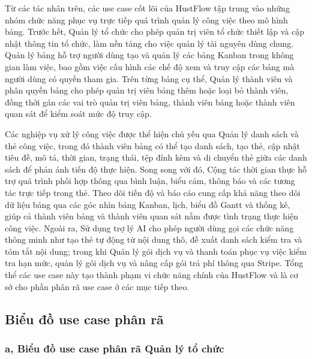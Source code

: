 \documentclass[../DoAn.tex]{subfiles}
\begin{document}
Từ các tác nhân trên, các use case cốt lõi của HustFlow tập trung vào những nhóm chức năng phục vụ trực tiếp quá trình quản lý công việc theo mô hình bảng. Trước hết, Quản lý tổ chức cho phép quản trị viên tổ chức thiết lập và cập nhật thông tin tổ chức, làm nền tảng cho việc quản lý tài nguyên dùng chung. Quản lý bảng hỗ trợ người dùng tạo và quản lý các bảng Kanban trong không gian làm việc, bao gồm việc cấu hình các chế độ xem và truy cập các bảng mà người dùng có quyền tham gia. Trên từng bảng cụ thể, Quản lý thành viên và phân quyền bảng cho phép quản trị viên bảng thêm hoặc loại bỏ thành viên, đồng thời gán các vai trò quản trị viên bảng, thành viên bảng hoặc thành viên quan sát để kiểm soát mức độ truy cập.

Các nghiệp vụ xử lý công việc được thể hiện chủ yếu qua Quản lý danh sách và thẻ công việc, trong đó thành viên bảng có thể tạo danh sách, tạo thẻ, cập nhật tiêu đề, mô tả, thời gian, trạng thái, tệp đính kèm và di chuyển thẻ giữa các danh sách để phản ánh tiến độ thực hiện. Song song với đó, Cộng tác thời gian thực hỗ trợ quá trình phối hợp thông qua bình luận, biểu cảm, thông báo và các tương tác trực tiếp trong thẻ. Theo dõi tiến độ và báo cáo cung cấp khả năng theo dõi dữ liệu bảng qua các góc nhìn bảng Kanban, lịch, biểu đồ Gantt và thống kê, giúp cả thành viên bảng và thành viên quan sát nắm được tình trạng thực hiện công việc. Ngoài ra, Sử dụng trợ lý AI cho phép người dùng gọi các chức năng thông minh như tạo thẻ tự động từ nội dung thô, đề xuất danh sách kiểm tra và tóm tắt nội dung; trong khi Quản lý gói dịch vụ và thanh toán phục vụ việc kiểm tra hạn mức, quản lý gói dịch vụ và nâng cấp gói trả phí thông qua Stripe. Tổng thể các use case này tạo thành phạm vi chức năng chính của HustFlow và là cơ sở cho phần phân rã use case ở các mục tiếp theo.

\subsection{Biểu đồ use case phân rã}
\label{subsection:2.2.2}

\subsubsection*{a, Biểu đồ use case phân rã Quản lý tổ chức}
\end{document}
